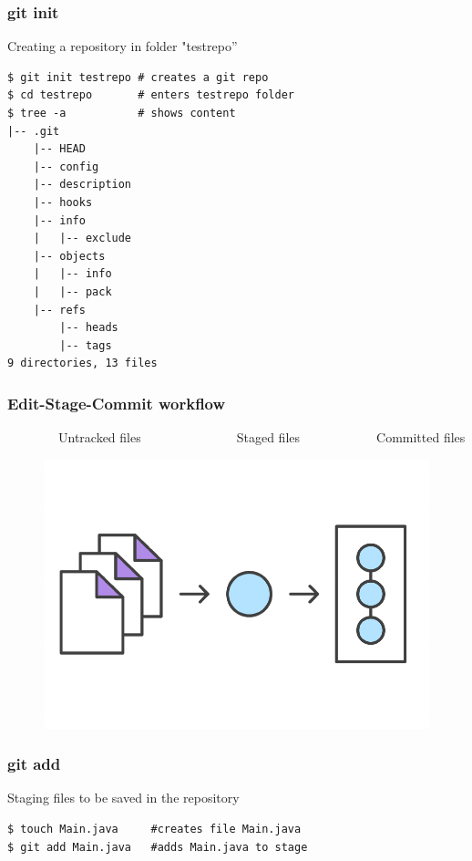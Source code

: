 \documentclass{beamer}
\begin{document}
\begin{frame}[fragile]
\frametitle{git init}
Creating a repository in folder "testrepo''
\small
\begin{lstlisting}
$ git init testrepo # creates a git repo 
$ cd testrepo       # enters testrepo folder
$ tree -a           # shows content
|-- .git
    |-- HEAD
    |-- config
    |-- description
    |-- hooks
    |-- info
    |   |-- exclude
    |-- objects
    |   |-- info
    |   |-- pack
    |-- refs
        |-- heads
        |-- tags
9 directories, 13 files
\end{lstlisting}

\end{frame}


\begin{frame}
\frametitle{Edit-Stage-Commit workflow}
~~~~~~~~Untracked files~~~~~~~~~~~~~~~Staged files~~~~~~~~~~~~Committed files
\begin{figure}
\includegraphics[scale=0.7]{figures/04.pdf}
\end{figure}

\end{frame}

\begin{frame}[fragile]
\frametitle{git add}

Staging files to be saved in the repository

\begin{lstlisting}
$ touch Main.java     #creates file Main.java
$ git add Main.java   #adds Main.java to stage
\end{lstlisting}

\end{frame}
\end{document}
